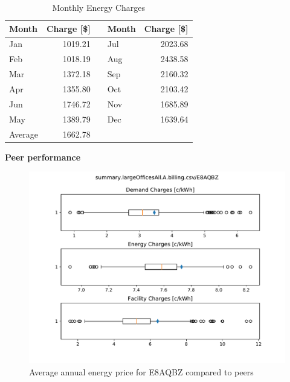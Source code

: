 \documentclass[11pt]{article}
\begin{document}
\begin{table}[th!]
  \centering
  \caption{Monthly Energy Charges}
  \vspace{1.5ex}
  \label{tab:energy}
  \begin{tabular}{p{0.75in}rp{0.2in}p{0.75in}r}
    Month & Charge [\$] & & Month & Charge [\$] \\
    \midrule
    Jan & 1019.21 & & Jul & 2023.68 \\
    Feb & 1018.19 & & Aug & 2438.58 \\
    Mar & 1372.18 & & Sep & 2160.32 \\
    Apr & 1355.80 & & Oct & 2103.42 \\
    Jun & 1746.72 & & Nov & 1685.89 \\
    May & 1389.79 & & Dec & 1639.64 \\
    \midrule
    Average & 1662.78 & & &
  \end{tabular}
\end{table}

\vspace{3ex}
\textbf{\Large Peer performance}
\vspace{1ex}

\lipsum[1][1-7]

\begin{figure}[!h]
\centering
\includegraphics[width=\columnwidth, page=1, trim=0in 2.1in 0in 2.1in, clip]{visuals/E8AQBZ.whiskerchart.pdf}
\caption{Average annual energy price for E8AQBZ compared to peers}
\label{fig:PeerCompEn}
\end{figure}

\clearpage
\end{document}
